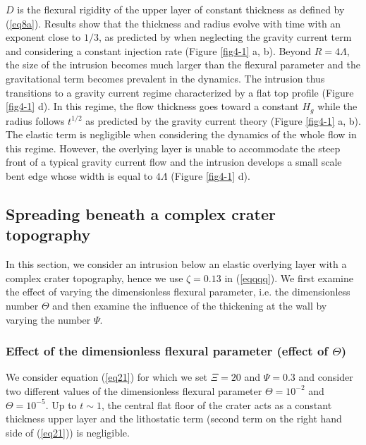 \begin{article}
        $D$ is  the flexural rigidity  of the upper layer  of constant
        thickness as  defined by  (\ref{eq8a}). Results show  that the
        thickness and radius  evolve with time with  an exponent close
        to $1/3$, as predicted  by \citet{Michaut2011} when neglecting
        the gravity current term  and considering a constant injection
        rate (Figure \ref{fig4-1} a, b). Beyond $R=4\Lambda$, the size
        of  the  intrusion  becomes  much  larger  than  the  flexural
        parameter and the gravitational  term becomes prevalent in the
        dynamics. The intrusion thus  transitions to a gravity current
        regime   characterized  by   a   flat   top  profile   (Figure
        \ref{fig4-1}  d).  In this  regime,  the  flow thickness  goes
        toward a constant $H_g$ while  the radius follows $t^{1/2}$ as
        predicted  by the  gravity current  theory \citep{Huppert1982}
        (Figure  \ref{fig4-1} a,  b). The  elastic term  is negligible
        when  considering  the dynamics  of  the  whole flow  in  this
        regime. However, the overlying  layer is unable to accommodate
        the   steep  front   of   a  typical   gravity  current   flow
        \citep{Huppert1982} and  the intrusion develops a  small scale
        bent  edge   whose  width  is  equal   to  $4\Lambda$  (Figure
        \ref{fig4-1} d).
		
	\subsection{Spreading beneath a complex crater topography}
		
        In this  section, we  consider an  intrusion below  an elastic
        overlying layer with a complex crater topography, hence we use
        $\zeta=0.13$ in (\ref{eqqqq}). We  first examine the effect of
        varying  the   dimensionless  flexural  parameter,   i.e.  the
        dimensionless number  $\Theta$ and then examine  the influence
        of the thickening at the wall by varying the number $\Psi$.
	
        \subsubsection{Effect of the  dimensionless flexural parameter
          (effect of $\Theta$)}
		
	We consider  equation (\ref{eq21})  for which we  set $\Xi=20$
        and  $\Psi=0.3$  and  consider  two different  values  of  the
        dimensionless   flexural    parameter   $\Theta=10^{-2}$   and
        $\Theta=10^{-5}$. Up  to $t\sim1$,  the central flat  floor of
        the crater  acts as a  constant thickness upper layer  and the
        lithostatic  term  (second term  on  the  right hand  side  of
        (\ref{eq21})) is negligible.
	

\end{article}
